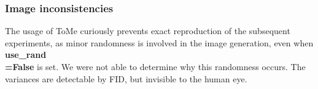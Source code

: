 \subsubsection*{Image inconsistencies}
The usage of ToMe curiously prevents exact reproduction of the subsequent experiments, as minor randomness is involved in the image generation, even when \textbf{use\_rand\\=False} is set. We were not able to determine why this randomness occurs. The
variances are detectable by FID, but invisible to the human eye.
